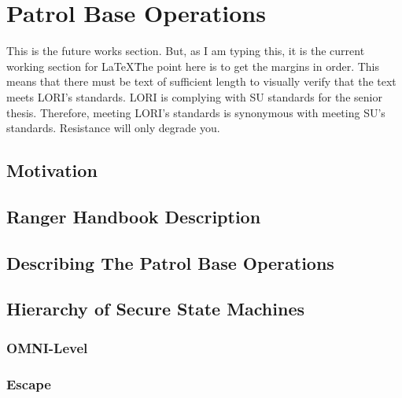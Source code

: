 \documentclass[../../main/main.tex]{subfiles}
\begin{document}
\rhead{\thepage}
\lhead{}
\chead{}
\lfoot{}
\rfoot{}
\cfoot{}
\renewcommand{\headrulewidth}{0pt}


\chapter{Patrol Base Operations}
This is the future works section. But, as I am typing this, it is the current working section for \LaTeX\.  The point here is to get the margins in order.  This means that there must be text of sufficient length to visually verify that the text meets LORI's standards.  LORI is complying with SU standards for the senior thesis.  Therefore, meeting LORI's standards is synonymous with meeting SU's standards.  Resistance will only degrade you.
\section{Motivation}

\section{Ranger Handbook Description}

\section{Describing The Patrol Base Operations}

\section{Hierarchy of Secure State Machines}

\subsection{OMNI-Level}

\subsection{Escape}
\end{document}
